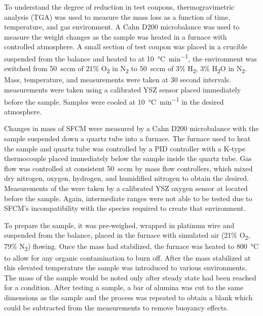     To understand the degree of reduction in test coupons, thermogravimetric analysis (TGA) was used to measure the mass loss as a function of time,
    temperature, and gas environment.
    A Cahn D200 microbalance was used to measure the weight changes as the sample was heated in a furnace with controlled atmosphere.
    A small section of test coupon was placed in a crucible suspended from the balance and heated to  at \SI{10}{\celsius\per\minute}, the environment was switched from \SI{50}{sccm} of 21\% O\textsubscript{2} in
    N\textsubscript{2} to \SI{50}{sccm} of 3\% H\textsubscript{2}, 3\%
    H\textsubscript{2}O in N\textsubscript{2}.
    Mass, temperature, and
     measurements were taken at 30 second intervals.
     measurements were taken using a calibrated YSZ sensor placed immediately before the sample.
    Samples were cooled at \SI{10}{\celsius\per\minute} in the desired atmosphere.

    Changes in mass of SFCM were measured by a Cahn D200 microbalance with the sample suspended down a quartz tube into a furnace.
    The furnace used to heat the sample and quartz tube was controlled by a PID controller with a K-type thermocouple placed immediately below the sample inside the quartz tube.
    Gas flow was controlled at consistent \SI{50}{sccm} by mass flow controllers, which mixed dry nitrogen, oxygen, hydrogen, and humidified nitrogen to obtain the  desired.
    Measurements of the  were taken by a calibrated YSZ oxygen sensor at  located before the sample.
    Again, intermediate  ranges were not able to be tested due to SFCM's incompatibility with the species required to create that environment.

    To prepare the sample, it was pre-weighed, wrapped in platinum wire and suspended from the balance, placed in the furnace with simulated air (21\% O\textsubscript{2}, 79\% N\textsubscript{2}) flowing.
    Once the mass had stabilized, the furnace was heated to \SI{800}{\celsius} to allow for any organic contamination to burn off.
    After the mass stabilized at this elevated temperature the sample was introduced to various environments.
    The mass of the sample would be noted only after steady state had been reached for a condition.
    After testing a sample, a bar of alumina was cut to the same dimensions as the sample and the process was repeated to obtain a blank which could be subtracted from the measurements to remove buoyancy effects.

